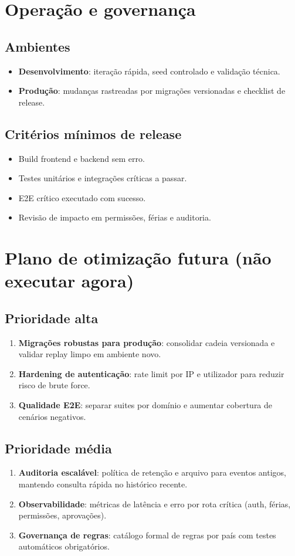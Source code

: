 \documentclass[11pt,a4paper]{article}
\begin{document}
\section{Operação e governança}
\subsection{Ambientes}
\begin{itemize}
  \item \textbf{Desenvolvimento}: iteração rápida, seed controlado e validação técnica.
  \item \textbf{Produção}: mudanças rastreadas por migrações versionadas e checklist de release.
\end{itemize}

\subsection{Critérios mínimos de release}
\begin{itemize}
  \item Build frontend e backend sem erro.
  \item Testes unitários e integrações críticas a passar.
  \item E2E crítico executado com sucesso.
  \item Revisão de impacto em permissões, férias e auditoria.
\end{itemize}

\section{Plano de otimização futura (não executar agora)}
\subsection{Prioridade alta}
\begin{enumerate}
  \item \textbf{Migrações robustas para produção}: consolidar cadeia versionada e validar replay limpo em ambiente novo.
  \item \textbf{Hardening de autenticação}: rate limit por IP e utilizador para reduzir risco de brute force.
  \item \textbf{Qualidade E2E}: separar suites por domínio e aumentar cobertura de cenários negativos.
\end{enumerate}

\subsection{Prioridade média}
\begin{enumerate}
  \item \textbf{Auditoria escalável}: política de retenção e arquivo para eventos antigos, mantendo consulta rápida no histórico recente.
  \item \textbf{Observabilidade}: métricas de latência e erro por rota crítica (auth, férias, permissões, aprovações).
  \item \textbf{Governança de regras}: catálogo formal de regras por país com testes automáticos obrigatórios.
\end{enumerate}
\end{document}
